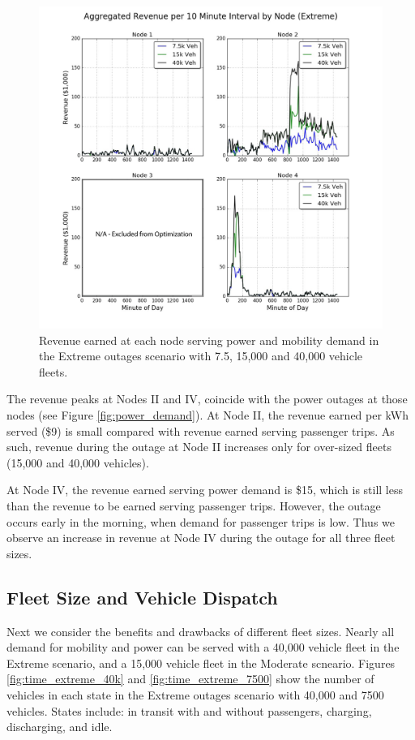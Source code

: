 \documentclass[journal]{IEEEtran}
\begin{document}
\begin{figure}[!htbp]
  \includegraphics[width=\linewidth]{plots/aggregated-revenue-by-node.pdf}
  \caption{Revenue earned at each node serving power and mobility demand in the Extreme outages scenario with 7.5, 15,000 and 40,000 vehicle fleets.}
  \label{fig:node_revenue}
\end{figure}

The revenue peaks at Nodes II and IV, coincide with the power outages at those nodes (see Figure \ref{fig:power_demand}). At Node II, the revenue earned per kWh served (\$9) is small compared with revenue earned serving passenger trips. As such, revenue during the outage at Node II increases only for over-sized fleets (15,000 and 40,000 vehicles). 

At Node IV, the revenue earned serving power demand is \$15, which is still less than the revenue to be earned serving passenger trips. However, the outage occurs early in the morning, when demand for passenger trips is low. Thus we observe an increase in revenue at Node IV during the outage for all three fleet sizes.

\subsection{Fleet Size and Vehicle Dispatch}
Next we consider the benefits and drawbacks of different fleet sizes. Nearly all demand for mobility and power can be served with a 40,000 vehicle fleet in the Extreme scenario, and a 15,000 vehicle fleet in the Moderate scneario. Figures \ref{fig:time_extreme_40k} and \ref{fig:time_extreme_7500} show the number of vehicles in each state in the Extreme outages scenario with 40,000 and 7500 vehicles. States include: in transit with and without passengers, charging, discharging, and idle. 
\end{document}

